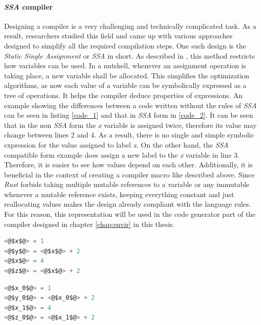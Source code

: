\paragraph{\textit{SSA} compiler} \label{ssadec}
Designing a compiler is a very challenging and technically complicated task. As a result, researchers studied this field and came up with various approaches designed to simplify all the required compilation steps. One such design is the \textit{Static Single Assignment} or \textit{SSA} in short. As described in \cite{ssabook}, this method restricts how variables can be used. In a nutshell, whenever an assignment operation is taking place, a new variable shall be allocated. This simplifies the optimization algorithms, as now each value of a variable can be symbolically expressed as a tree of operations. It helps the compiler deduce properties of expressions. An example showing the differences between a code written without the rules of \textit{SSA} can be seen in listing \ref{code_1} and that in \textit{SSA} form in \ref{code_2}. It can be seen that in the non \textit{SSA} form the \textit{x} variable is assigned twice, therefore its value may change between lines 2 and 4. As a result, there is no single and simple symbolic expression for the value assigned to label \textit{x}. On the other hand, the \textit{SSA} compatible form example does assign a new label to the \textit{x} variable in line 3. Therefore, it is easier to see how values depend on each other. Additionally, it is beneficial in the context of creating a compiler macro like described above. Since \textit{Rust} forbids taking multiple mutable references to a variable or any immutable whenever a mutable reference exists, keeping everything constant and just reallocating values makes the design already compliant with the language rules. For this reason, this representation will be used in the code generator part of the compiler designed in chapter \ref{chap:envir} in this thesis.

\begin{minipage}{.4\textwidth}
    \begin{lstlisting}[language=C,caption={Code example containing assigments.},captionpos=b,label={code_1}]
<@$x$@> = 1
<@$y$@> = <@$x$@> + 2
<@$x$@> = 4
<@$z$@> = <@$x$@> + 2
    \end{lstlisting}
\end{minipage}
\hfill\vline\hfill
\begin{minipage}{.4\textwidth}
    \begin{lstlisting}[language=C,caption={Code example in SSO notation.},captionpos=b,label={code_2}]
<@$x_0$@> = 1
<@$y_0$@> = <@$x_0$@> + 2
<@$x_1$@> = 4
<@$z_0$@> = <@$x_1$@> + 2
    \end{lstlisting}    
\end{minipage}
